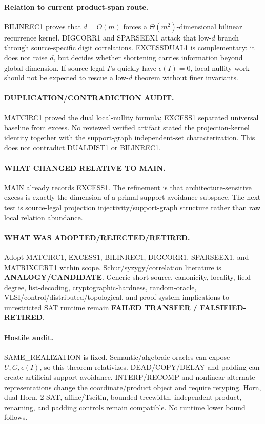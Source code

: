 \documentclass[11pt]{article}
\begin{document}
\paragraph{Relation to current product-span route.}
BILINREC1 proves that \(d=O(m)\) forces a \(\Theta(m^2)\)-dimensional bilinear recurrence kernel. DIGCORR1 and SPARSEEX1 attack that low-\(d\) branch through source-specific digit correlations. EXCESSDUAL1 is complementary: it does not raise \(d\), but decides whether shortening carries information beyond global dimension. If source-legal \(I\)'s quickly have \(\epsilon(I)=0\), local-nullity work should not be expected to rescue a low-\(d\) theorem without finer invariants.

\paragraph{DUPLICATION/CONTRADICTION AUDIT.}
MATCIRC1 proved the dual local-nullity formula; EXCESS1 separated universal baseline from excess. No reviewed verified artifact stated the projection-kernel identity together with the support-graph independent-set characterization. This does not contradict DUALDIST1 or BILINREC1.

\paragraph{WHAT CHANGED RELATIVE TO MAIN.}
MAIN already records EXCESS1. The refinement is that architecture-sensitive excess is exactly the dimension of a primal support-avoidance subspace. The next test is source-legal projection injectivity/support-graph structure rather than raw local relation abundance.

\paragraph{WHAT WAS ADOPTED/REJECTED/RETIRED.}
Adopt MATCIRC1, EXCESS1, BILINREC1, DIGCORR1, SPARSEEX1, and MATRIXCERT1 within scope. Schur/syzygy/correlation literature is \textbf{ANALOGY/CANDIDATE}. Generic short-source, canonicity, locality, field-degree, list-decoding, cryptographic-hardness, random-oracle, VLSI/control/distributed/topological, and proof-system implications to unrestricted SAT runtime remain \textbf{FAILED TRANSFER / FALSIFIED-RETIRED}.

\paragraph{Hostile audit.}
SAME\_REALIZATION is fixed. Semantic/algebraic oracles can expose \(U,G,\epsilon(I)\), so this theorem relativizes. DEAD/COPY/DELAY and padding can create artificial support avoidance. INTERP/RECOMP and nonlinear alternate representations change the coordinate/product object and require retyping. Horn, dual-Horn, 2-SAT, affine/Tseitin, bounded-treewidth, independent-product, renaming, and padding controls remain compatible. No runtime lower bound follows.
\end{document}
